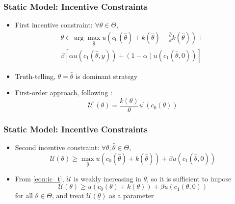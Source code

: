 \documentclass{beamer}
\newcommand{\p}{\prime}
\newcommand{\U}{\mathcal{U}}
\begin{document}
\begin{frame}
    \frametitle{Static Model: Incentive Constraints}

    \begin{itemize}
        \item First incentive constraint: \( \forall \theta\in\Theta \),
        \begin{multline}
            \theta\in\arg\max_{\hat{\theta}}u\left(c_{0}\left(\hat{\theta}\right)+k\left(\hat{\theta}\right)-\frac{\hat{\theta}}{\theta}k\left(\hat{\theta}\right)\right)+\\
            \beta\left[\alpha u\left(c_{1}\left(\hat{\theta},y\right)\right)+\left(1-\alpha\right)u\left(c_{1}\left(\hat{\theta},0\right)\right)\right]\label{eqn:ics}
        \end{multline}
        \item Truth-telling, \( \theta=\hat{\theta} \) is dominant strategy
        \item First-order approach, following \cite{jewitt1988justifying}: 
        \begin{equation}
            \U^\p(\theta) = \frac{k(\theta)}{\theta}u^\p\left( c_0(\theta) \right) \label{eqn:ic_t}
        \end{equation}
    \end{itemize}

\end{frame}

\begin{frame}
    \frametitle{Static Model: Incentive Constraints}

    \begin{itemize}
        \item Second incentive constraint: \( \forall\theta,\hat{\theta}\in\Theta \),
        \begin{equation}
            \U(\theta)\geq \max_{\hat{\theta}} u\left( c_0(\hat{\theta}) + k(\hat{\theta}) \right) + \beta u\left( c_1(\hat{\theta},0) \right) \label{eqn:nolie}
        \end{equation}
        \item From \eqref{eqn:ic_t}, \( \U \) is weakly increasing in \( \theta \), so it is sufficient to impose
        \begin{equation}
            \U(\underline{\theta})\geq u\left(c_{0}\left(\theta\right)+k\left(\theta\right)\right)+\beta u\left(c_{1}\left(\theta,0\right)\right)\label{eqn:nolie1}
        \end{equation}
        for all \( \theta\in\Theta \), and treat \( \U\left( \underline{\theta} \right) \) as a parameter 
    \end{itemize}

\end{frame}
\end{document}
